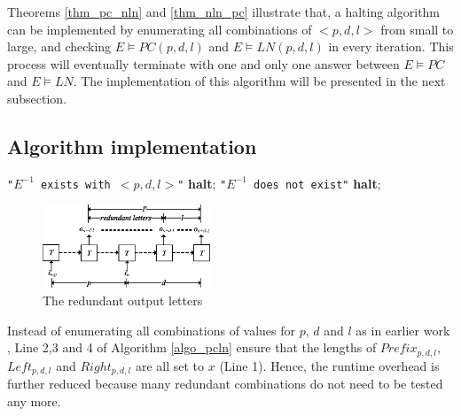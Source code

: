 \documentclass[journal]{IEEEtran}
\begin{document}
Theorems \ref{thm_pc_nln} and \ref{thm_nln_pc} illustrate that,
a halting algorithm can be implemented by
enumerating all combinations of $<p,d,l>$ from small to large,
and checking $E\vDash PC(p,d,l)$ and $E\vDash LN(p,d,l)$ in every iteration.
This process will eventually terminate with one and only one answer between $E\vDash PC$ and $E\vDash LN$.
The implementation of this algorithm will be presented in the next subsection.

\subsection{Algorithm implementation}\label{subsec_algoimp}

\begin{algorithm}
\caption{$check\_PCLN$}
\label{algo_pcln}
\begin{algorithmic}[1]
        \PRINT \texttt{"$E^{-1}$ exists with $<p,d,l>$"}\label{lab_pc}
        \STATE \textbf{halt};
        \PRINT \texttt{"$E^{-1}$ does not exist"}\label{lab_ln}
        \STATE \textbf{halt};
      \ENDIF
\ENDFOR
\end{algorithmic}
\end{algorithm}

\begin{figure}[b]
\begin{center}
\includegraphics[width=0.45\textwidth]{rmred}
\end{center}
\caption{The redundant output letters}
  \label{fig_rmred}
\end{figure}

Instead of enumerating all combinations of values for $p$, $d$ and $l$ as in earlier work \cite{ShengYuShen:iccad09,ShengYuShen:tcad},
Line 2,3 and 4 of Algorithm \ref{algo_pcln} ensure that the lengths of $Prefix_{p,d,l}$,$Left_{p,d,l}$ and $Right_{p,d,l}$ are all set to $x$ (Line 1).
Hence,
the runtime overhead is further reduced because many redundant combinations do not need to be tested any more.
\end{document}
